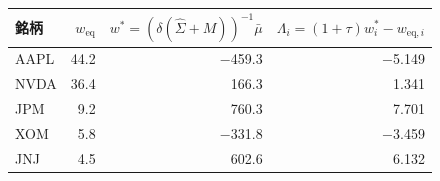 \begin{tabular}{lrrr}
\toprule
銘柄 & $w_{\mathrm{eq}}$ & $w^* = (\delta(\hat\Sigma + M))^{-1}\bar\mu$ & $\Lambda_i = (1+\tau)w^*_i - w_{\mathrm{eq},i}$ \\
\midrule
AAPL & 44.2 & \ensuremath{-}459.3 & \ensuremath{-}5.149 \\
NVDA & 36.4 & 166.3 & 1.341 \\
JPM & 9.2 & 760.3 & 7.701 \\
XOM & 5.8 & \ensuremath{-}331.8 & \ensuremath{-}3.459 \\
JNJ & 4.5 & 602.6 & 6.132 \\
\bottomrule
\end{tabular}
